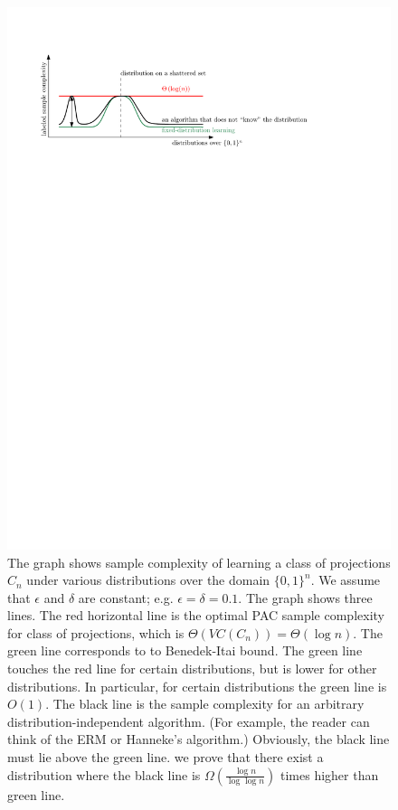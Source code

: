 \documentclass[10pt]{article}
\begin{document}
\begin{figure}
\centering
\includegraphics{figure}
\caption{The graph shows sample complexity of learning a class of projections $C_n$ under
various distributions over the domain $\{0,1\}^n$. We assume that $\epsilon$ and
$\delta$ are constant; e.g. $\epsilon = \delta = 0.1$. The graph shows three
lines. The red horizontal line is the optimal PAC sample complexity for class of
projections, which is $\Theta(VC(C_n)) = \Theta(\log n)$. The green line
corresponds to to Benedek-Itai bound. The green line touches the red line for
certain distributions, but is lower for other distributions. In particular, for
certain distributions the green line is $O(1)$. The black line is the sample
complexity for an arbitrary distribution-independent algorithm. (For example,
the reader can think of the ERM or Hanneke's algorithm.) Obviously, the black
line must lie above the green line. we prove that there exist a distribution
where the black line is $\Omega(\frac{\log n}{\log \log n})$ times higher than
green line.}
\label{figure:sample-complexity}
\end{figure}
\end{document}
